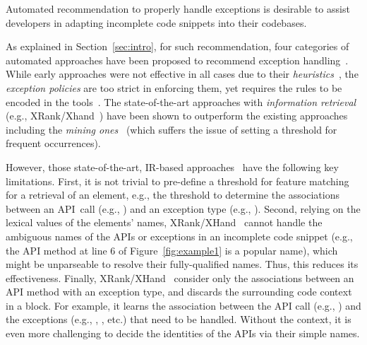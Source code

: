 \begin{Observation} 
Automated recommendation to properly handle exceptions is desirable to
assist developers in adapting incomplete code snippets into their
codebases.
\end{Observation}


As explained in Section~\ref{sec:intro}, for such recommendation, four
categories of automated approaches have been proposed to recommend
exception
handling~\cite{xrank-fse20,barbosa-bsse12,chanchal-scam14,barbosa-tse18,barbosa-tse16}. While
early approaches were not effective in all cases due to their {\em
  heuristics}~\cite{barbosa-bsse12}, the {\em exception policies} are
too strict in enforcing them, yet requires the rules to be encoded in
the tools~\cite{barbosa-tse16,barbosa-saner18}. The state-of-the-art
approaches with {\em information retrieval} (e.g.,
XRank/Xhand~\cite{xrank-fse20}) have been shown to outperform the
existing approaches including the {\em mining
  ones}~\cite{chanchal-scam14} (which suffers the issue of setting a
threshold for frequent occurrences).


However, those state-of-the-art, IR-based
approaches~\cite{xrank-fse20} have the following key
limitations. First, it is not trivial to pre-define a threshold for
feature matching for a retrieval of an element, e.g., the threshold to
determine the associations between an API~call (e.g.,
) and an exception type (e.g.,
). Second, relying on the lexical
values of the elements' names, XRank/XHand~\cite{xrank-fse20} cannot
handle the ambiguous names of the APIs or exceptions in an incomplete
code snippet (e.g., the API method  at line 6 of
Figure~\ref{fig:example1} is a popular name), which might be
unparseable to resolve their fully-qualified names. Thus, this reduces
its effectiveness. Finally, XRank/XHand~\cite{xrank-fse20} consider
only the associations between an API method with an exception type,
and discards the surrounding code context in a  block.
For example, it learns the association between the API call (e.g.,
) and the exceptions (e.g.,
, , etc.)
that need to be handled. Without the context, it is even more
challenging to decide the identities of the APIs via their simple
names.

